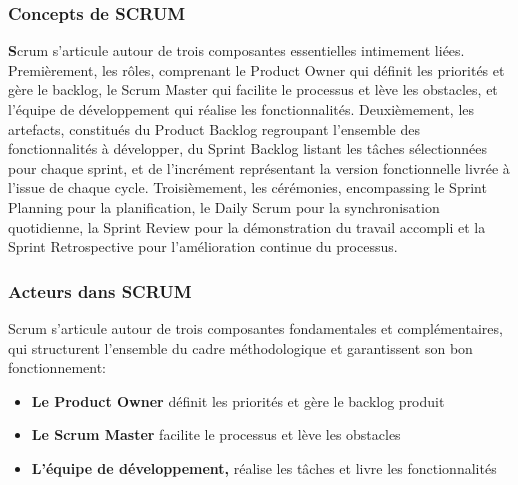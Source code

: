  


\vspace*{-0.5cm}
\subsubsection{Concepts de SCRUM}
\hspace{1.5cm}\textbf Scrum s'articule autour de trois composantes essentielles intimement liées. Premièrement, les rôles, comprenant le Product Owner qui définit les priorités et gère le backlog, le Scrum Master qui facilite le processus et lève les obstacles, et l'équipe de développement qui réalise les fonctionnalités. Deuxièmement, les artefacts, constitués du Product Backlog regroupant l'ensemble des fonctionnalités à développer, du Sprint Backlog listant les tâches sélectionnées pour chaque sprint, et de l'incrément représentant la version fonctionnelle livrée à l'issue de chaque cycle. Troisièmement, les cérémonies, encompassing le Sprint Planning pour la planification, le Daily Scrum pour la synchronisation quotidienne, la Sprint Review pour la démonstration du travail accompli et la Sprint Retrospective pour l'amélioration continue du processus.


\subsubsection{Acteurs dans SCRUM} 
Scrum s'articule autour de trois composantes fondamentales et complémentaires, qui structurent l'ensemble du cadre méthodologique et garantissent son bon fonctionnement:
 \begin{itemize}[label=\textbullet]
 \item 	\textbf{Le Product Owner}   définit les priorités et gère le backlog produit
  \item \textbf{Le Scrum Master} facilite le processus et lève les obstacles
  \item \textbf{L’équipe de développement,} réalise les tâches et livre les fonctionnalités
\end{itemize}

